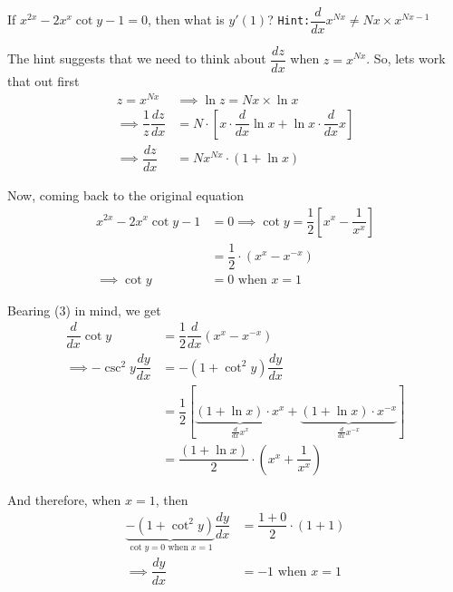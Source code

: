 

\question[3] If $x^{2x}-2x^{x}\cot y - 1 = 0$, then what is $y'(1)$?
\texttt{Hint:}$\dfrac{d}{dx}x^{Nx}\neq Nx\times x^{Nx-1}$


\ifprintanswers
\fi 

\begin{solution}[\halfpage]
  The hint suggests that we need to think about $\dfrac{dz}{dx}$ when $z=x^{Nx}$. So, lets work that out first 
  \begin{align}
    z = x^{Nx} &\implies \ln z = Nx\times\ln x \\
    \implies \dfrac{1}{z}\dfrac{dz}{dx} &= N\cdot\left[ x\cdot\dfrac{d}{dx}\ln x + \ln x\cdot\dfrac{d}{dx}x\right] \\
    \implies \dfrac{dz}{dx} &= Nx^{Nx}\cdot(1+\ln x)
  \end{align}
  
  Now, coming back to the original equation
	\begin{align}
	  x^{2x}-2x^{x}\cot y - 1 &= 0 \implies
	  \cot y = \dfrac{1}{2}\left[x^{x}-\dfrac{1}{x^{x}} \right] \\
	  &= \dfrac{1}{2}\cdot(x^x-x^{-x}) \\
	  \implies\cot y &= 0 \text{ when } x = 1
	\end{align}
	
	Bearing (3) in mind, we get 
	\begin{align}
	  \dfrac{d}{dx}\cot y &= \dfrac{1}{2}\dfrac{d}{dx}(x^x-x^{-x}) \\
	  \implies -\csc^2 y\dfrac{dy}{dx} &= -(1+\cot^2 y)\dfrac{dy}{dx} \nonumber\\ 
	  &= \dfrac{1}{2}\left[ \underbrace{(1+\ln x)\cdot x^x}_{\frac{d}{dx}x^x} + 
	  \underbrace{(1+\ln x)\cdot x^{-x}}_{\frac{d}{dx}x^{-x}}\right] \\
	  &= \dfrac{(1+\ln x)}{2}\cdot\left(x^x + \dfrac{1}{x^x}\right)
	\end{align}
	
	And therefore, when $x=1$, then 
	\begin{align}
	  \underbrace{-(1+\cot^2 y)}_{\cot y = 0\text{ when } x=1}\dfrac{dy}{dx} &= 
	  \dfrac{1+0}{2}\cdot (1+1) \\
	  \implies \dfrac{dy}{dx} &= -1 \text{ when } x=1
	\end{align}	
\end{solution}

